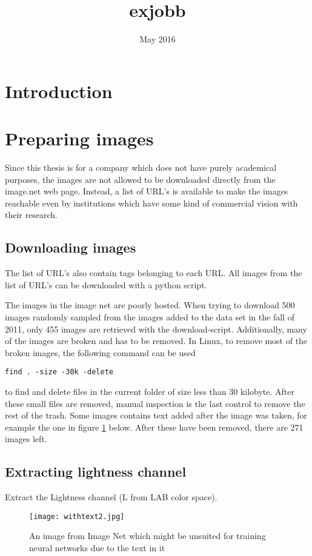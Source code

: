 \documentclass{article}
\title{exjobb}
\author{ }
\date{May 2016}
\begin{document}
\maketitle

\section{Introduction}
\section{Preparing images}
Since this thesis is for a company which does not have purely academical purposes, the images are not allowed to be downloaded directly from the image.net web page. Instead, a list of URL's is available to make the images reachable even by institutions which have some kind of commercial vision with their research.

\subsection{Downloading images}
The list of URL's also contain tags belonging to each URL. All images from the list of URL's can be downloaded with a python script.

The images in the image net are poorly hosted. When trying to download 500 images randomly sampled from the images added to the data set in the fall of 2011, only 455 images are retrieved with the download-script. Additionally, many of the images are broken and has to be removed. In Linux, to remove most of the broken images, the following command can be used 
\begin{lstlisting}
find . -size -30k -delete
\end{lstlisting} to find and delete files in the current folder of size less than 30 kilobyte. After these small files are removed, manual inspection is the last control to remove the rest of the trash. Some images contains text added after the image was taken, for example the one in figure \ref{fig:img_with_text} below.
After these have been removed, there are 271 images left.

\subsection{Extracting lightness channel}
Extract the Lightness channel (L from LAB color space). 

\begin{figure}[hbtp]
\centering
\texttt{[image: withtext2.jpg]}
\caption{An image from Image Net which might be unsuited for training neural networks due to the text in it}
\label{fig:img_with_text}
\end{figure}
\end{document}
